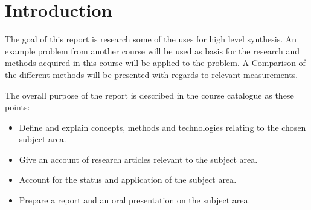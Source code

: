 \chapter{Introduction}
The goal of this report is research some of the uses for high level synthesis. An example problem from another course will be used as basis for the research and methods acquired in this course will be applied to the problem. A Comparison of the different methods will be presented with regards to relevant measurements.

The overall purpose of the report is described in the course catalogue as these points:
\begin{itemize}
\item Define and explain concepts, methods and technologies relating to the chosen subject area.
\item Give an account of research articles relevant to the subject area.
\item Account for the status and application of the subject area.
\item Prepare a report and an oral presentation on the subject area.
\end{itemize}
  